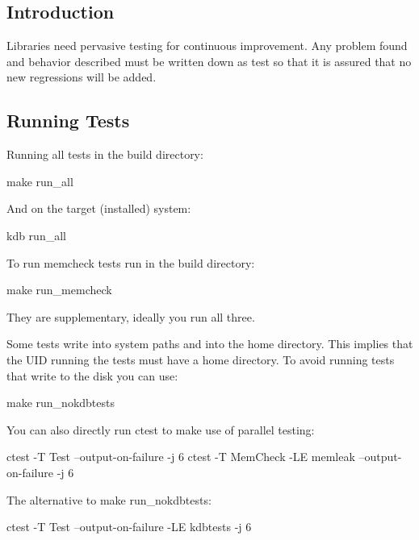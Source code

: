 \subsection*{Introduction}

Libraries need pervasive testing for continuous improvement. Any problem found and behavior described must be written down as test so that it is assured that no new regressions will be added.

\subsection*{Running Tests}

Running all tests in the build directory\+:


\begin{DoxyCode}
make run\_all
\end{DoxyCode}


And on the target (installed) system\+:


\begin{DoxyCode}
kdb run\_all
\end{DoxyCode}


To run {\ttfamily memcheck} tests run in the build directory\+:


\begin{DoxyCode}
make run\_memcheck
\end{DoxyCode}


They are supplementary, ideally you run all three.

Some tests write into system paths and into the home directory. This implies that the U\+ID running the tests must have a home directory. To avoid running tests that write to the disk you can use\+:


\begin{DoxyCode}
make run\_nokdbtests
\end{DoxyCode}


You can also directly run ctest to make use of parallel testing\+:


\begin{DoxyCode}
ctest -T Test --output-on-failure -j 6
ctest -T MemCheck -LE memleak --output-on-failure -j 6
\end{DoxyCode}


The alternative to {\ttfamily make run\+\_\+nokdbtests}\+:


\begin{DoxyCode}
ctest -T Test --output-on-failure -LE kdbtests -j 6
\end{DoxyCode}


